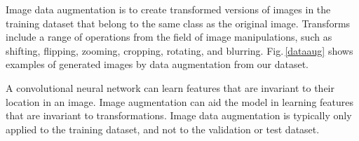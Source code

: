 Image data augmentation is to create transformed versions of images in the training dataset that belong to the same class as the original image. Transforms include a range of operations from the field of image manipulations, such as shifting, flipping, zooming, cropping, rotating, and blurring. Fig.\,\ref{dataaug} shows examples of generated images by data augmentation from our dataset.

A convolutional neural network can learn features that are invariant to their location in an image. Image augmentation can aid the model in learning features that are invariant to transformations. Image data augmentation is typically only applied to the training dataset, and not to the validation or test dataset. 




